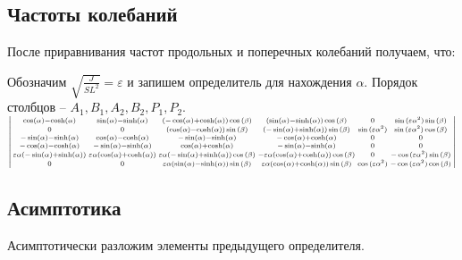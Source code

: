 \documentclass{article}
\begin{document}
\subsection{Частоты колебаний}

\noindent После приравнивания частот продольных и поперечных колебаний получаем, что: 

\noindent Обозначим $\sqrt{\frac{J}{S L^2}} = \varepsilon$ и запишем определитель для нахождения $\alpha$. Порядок столбцов -- $A_1,B_1,A_2,B_2,P_1,P_2$.\\

$\begin{vsmallmatrix}
\cos(\alpha)-\cosh(\alpha) & \sin(\alpha) - \sinh(\alpha) & (-\cos(\alpha)+\cosh(\alpha))\cos{(\beta)} & (\sin(\alpha) - \sinh(\alpha))\cos{(\beta)} & 0 & \sin{(\varepsilon \alpha^2)}\sin{(\beta)}\\
0 & 0 & (\cos(\alpha)-\cosh(\alpha))\sin{(\beta)} & (-\sin(\alpha) + \sinh(\alpha))\sin{(\beta)} & \sin{(\varepsilon \alpha^2)} & \sin{(\varepsilon \alpha^2)} \cos{(\beta)}\\
-\sin(\alpha)-\sinh(\alpha) & \cos(\alpha) - \cosh(\alpha) & -\sin(\alpha)-\sinh(\alpha) & -\cos(\alpha) + \cosh(\alpha) & 0 & 0 \\
-\cos(\alpha)-\cosh(\alpha) & -\sin(\alpha) - \sinh(\alpha) & \cos(\alpha)+\cosh(\alpha) & -\sin(\alpha) - \sinh(\alpha) & 0 & 0 \\
\varepsilon \alpha (-\sin(\alpha)+\sinh(\alpha)) & \varepsilon \alpha (\cos(\alpha) + \cosh(\alpha)) & \varepsilon \alpha (-\sin(\alpha)+\sinh(\alpha)) \cos{(\beta)} & -\varepsilon \alpha (\cos(\alpha) + \cosh(\alpha)) \cos{(\beta)}& 0 & -\cos{(\varepsilon \alpha^2)}\sin{(\beta)}\\
0 & 0 & \varepsilon \alpha (\sin(\alpha)-\sinh(\alpha)) \sin{(\beta)} & \varepsilon \alpha (\cos(\alpha) + \cosh(\alpha)) \sin{(\beta)} & \cos{(\varepsilon \alpha^2)} & -\cos{(\varepsilon \alpha^2)}\cos{(\beta)}
\end{vsmallmatrix}$

\subsection{Асимптотика}

Асимптотически разложим элементы предыдущего определителя.
\end{document}
